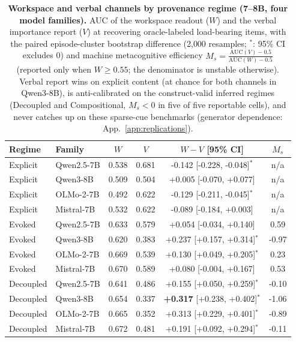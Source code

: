 \begin{table}[t]
\centering
\caption{\textbf{Workspace and verbal channels by provenance regime (7--8B, four model families).} AUC of the workspace
readout ($W$) and the verbal importance report ($V$) at recovering oracle-labeled
load-bearing items, with the paired episode-cluster bootstrap difference (2{,}000 resamples; $^{*}$:
95\% CI excludes 0) and machine metacognitive efficiency
$M_s{=}\frac{\mathrm{AUC}(V)-0.5}{\mathrm{AUC}(W)-0.5}$ (reported only when $W \ge 0.55$; the denominator is unstable otherwise).
Verbal report wins on explicit content (at chance for both channels in Qwen3-8B), is anti-calibrated on the
construct-valid inferred regimes (Decoupled and Compositional, $M_s<0$ in five
of five reportable cells), and never catches up on these sparse-cue benchmarks (generator dependence: App.~\ref{app:replications}).}
\label{tab:master}
\small
\begin{tabular}{llcccc}
\toprule
Regime & Family & $W$ & $V$ & $W-V$ [95\% CI] & $M_s$ \\
\midrule
Explicit & Qwen2.5-7B & 0.538 & 0.681 & \textcolor{loss}{-0.142} [-0.228, -0.048]$^{*}$ & n/a \\
Explicit & Qwen3-8B & 0.509 & 0.504 & +0.005 [-0.070, +0.077] & n/a \\
Explicit & OLMo-2-7B & 0.492 & 0.622 & \textcolor{loss}{-0.129} [-0.211, -0.045]$^{*}$ & n/a \\
Explicit & Mistral-7B & 0.532 & 0.622 & -0.089 [-0.184, +0.003] & n/a \\
\addlinespace
Evoked & Qwen2.5-7B & 0.633 & 0.579 & +0.054 [-0.034, +0.140] & 0.59 \\
Evoked & Qwen3-8B & 0.620 & 0.383 & \textcolor{gain}{+0.237} [+0.157, +0.314]$^{*}$ & -0.97 \\
Evoked & OLMo-2-7B & 0.669 & 0.539 & \textcolor{gain}{+0.130} [+0.049, +0.205]$^{*}$ & 0.23 \\
Evoked & Mistral-7B & 0.670 & 0.589 & +0.080 [-0.004, +0.167] & 0.53 \\
\addlinespace
Decoupled & Qwen2.5-7B & 0.641 & 0.486 & \textcolor{gain}{+0.155} [+0.050, +0.259]$^{*}$ & -0.10 \\
Decoupled & Qwen3-8B & 0.654 & 0.337 & \textcolor{gain}{\textbf{+0.317}} [+0.238, +0.402]$^{*}$ & -1.06 \\
Decoupled & OLMo-2-7B & 0.665 & 0.352 & \textcolor{gain}{+0.313} [+0.229, +0.401]$^{*}$ & -0.89 \\
Decoupled & Mistral-7B & 0.672 & 0.481 & \textcolor{gain}{+0.191} [+0.092, +0.294]$^{*}$ & -0.11 \\

\end{tabular}
\end{table}
